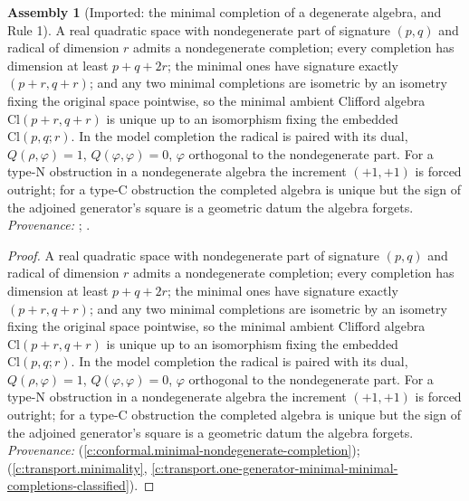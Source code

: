 \documentclass[11pt]{article}
\theoremstyle{definition}
\newtheorem{assembled}[theorem]{Assembly}
\theoremstyle{plain}
\providecommand{\Cl}{}\renewcommand{\Cl}{\mathrm{Cl}}
\begin{document}
\begin{assembled}[Imported: the minimal completion of a degenerate algebra, and Rule 1]\label{c:odd-extensions.imported-minimal-completion-degenerate-algebra-rule}
A real quadratic space with nondegenerate part of signature $(p,q)$ and radical of dimension $r$ admits a nondegenerate completion; every completion has dimension at least $p + q + 2r$; the minimal ones have signature exactly $(p+r, q+r)$; and any two minimal completions are isometric by an isometry fixing the original space pointwise, so the minimal ambient Clifford algebra $\Cl(p+r, q+r)$ is unique up to an isomorphism fixing the embedded $\Cl(p,q;r)$. In the model completion the radical is paired with its dual, $Q(\rho, \varphi) = 1$, $Q(\varphi,\varphi) = 0$, $\varphi$ orthogonal to the nondegenerate part. For a type-N obstruction in a nondegenerate algebra the increment $(+1,+1)$ is forced outright; for a type-C obstruction the completed algebra is unique but the sign of the adjoined generator's square is a geometric datum the algebra forgets. \emph{Provenance:} \cite[Thm.~2.3 and its model]{ButlerT2}; \cite[Thm.~4.13, Thm.~5.7 and Rem.~5.8]{ButlerT1}.
\end{assembled}
\begin{proof}
A real quadratic space with nondegenerate part of signature $(p,q)$ and radical of dimension $r$ admits a nondegenerate completion; every completion has dimension at least $p + q + 2r$; the minimal ones have signature exactly $(p+r, q+r)$; and any two minimal completions are isometric by an isometry fixing the original space pointwise, so the minimal ambient Clifford algebra $\Cl(p+r, q+r)$ is unique up to an isomorphism fixing the embedded $\Cl(p,q;r)$. In the model completion the radical is paired with its dual, $Q(\rho, \varphi) = 1$, $Q(\varphi,\varphi) = 0$, $\varphi$ orthogonal to the nondegenerate part. For a type-N obstruction in a nondegenerate algebra the increment $(+1,+1)$ is forced outright; for a type-C obstruction the completed algebra is unique but the sign of the adjoined generator's square is a geometric datum the algebra forgets. \emph{Provenance:} \cite[Thm.~2.3 and its model]{ButlerT2} (\ref{c:conformal.minimal-nondegenerate-completion}); \cite[Thm.~4.13, Thm.~5.7 and Rem.~5.8]{ButlerT1} (\ref{c:transport.minimality}, \ref{c:transport.one-generator-minimal-minimal-completions-classified}).

\end{proof}
\end{document}
